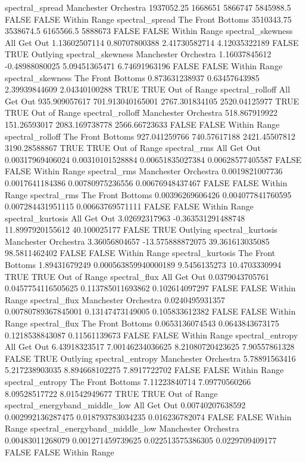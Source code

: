 spectral_spread Manchester Orchestra 1937052.25 1668651 5866747 5845988.5 FALSE FALSE Within Range
spectral_spread The Front Bottoms 3510343.75 3538674.5 6165566.5 5888673 FALSE FALSE Within Range
spectral_skewness All Get Out 1.13602507114 0.80707800388 2.41730582714 4.12035322189 FALSE TRUE Outlying
spectral_skewness Manchester Orchestra 1.16037845612 -0.48988080025 5.09451365471 6.74691963196 FALSE FALSE Within Range
spectral_skewness The Front Bottoms 0.873631238937 0.63457643985 2.39939844609 2.04340100288 TRUE TRUE Out of Range
spectral_rolloff All Get Out 935.909057617 701.913040165001 2767.301834105 2520.04125977 TRUE TRUE Out of Range
spectral_rolloff Manchester Orchestra 518.867919922 151.26593017 2083.169738778 2566.66723633 FALSE FALSE Within Range
spectral_rolloff The Front Bottoms 927.041259766 740.57617188 2421.45507812 3190.28588867 TRUE TRUE Out of Range
spectral_rms All Get Out 0.00317969406024 0.00310101528884 0.00651835027384 0.00628577405587 FALSE FALSE Within Range
spectral_rms Manchester Orchestra 0.0019821007736 0.0017641184386 0.00780975236556 0.00676948437467 FALSE FALSE Within Range
spectral_rms The Front Bottoms 0.00396269606426 0.004077841760595 0.007284431951115 0.00663769571111 FALSE FALSE Within Range
spectral_kurtosis All Get Out 3.02692317963 -0.363531291488748 11.8997920155612 40.100025177 FALSE TRUE Outlying
spectral_kurtosis Manchester Orchestra 3.36056804657 -13.575888872075 39.361613035085 98.5811462402 FALSE FALSE Within Range
spectral_kurtosis The Front Bottoms 1.89431679249 0.000563859940000189 9.5456135273 10.4703330994 TRUE TRUE Out of Range
spectral_flux All Get Out 0.0379043705761 0.0457754116505625 0.113785011693862 0.102614097297 FALSE FALSE Within Range
spectral_flux Manchester Orchestra 0.0240495931357 0.00780789367845001 0.13147473149005 0.105833612382 FALSE FALSE Within Range
spectral_flux The Front Bottoms 0.0653136074543 0.0643843673175 0.1218538843087 0.11561139673 FALSE FALSE Within Range
spectral_entropy All Get Out 6.43918323517 7.00146234036625 8.21080720423625 7.90557861328 FALSE TRUE Outlying
spectral_entropy Manchester Orchestra 5.78891563416 5.217238903035 8.894668102275 7.8917722702 FALSE FALSE Within Range
spectral_entropy The Front Bottoms 7.11223840714 7.09770560266 8.09528517722 8.01542949677 TRUE TRUE Out of Range
spectral_energyband_middle_low All Get Out 0.00740207638592 0.002992136287475 0.018793783034235 0.016236782074 FALSE FALSE Within Range
spectral_energyband_middle_low Manchester Orchestra 0.00483011268079 0.001271459739625 0.022513575386305 0.0229709409177 FALSE FALSE Within Range
